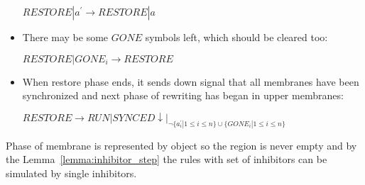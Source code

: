 \begin{dokaz}
\begin{itemize}
    $RESTORE|a^{\prime} \rightarrow RESTORE|a$

    \item There may be some $GONE$ symbols left, which should be cleared too:

    $RESTORE|GONE_i \rightarrow RESTORE$

    \item When restore phase ends, it sends down signal that all membranes have been synchronized and next phase of rewriting has began in upper membranes:

    $RESTORE \rightarrow RUN|SYNCED\downarrow|_{\neg \{a_i^{\prime}|1\leq i\leq n\}\cup\{GONE_i|1\leq i\leq n\}}$
  \end{itemize}


  Phase of membrane is represented by object so the region is never empty and by the Lemma~\ref{lemma:inhibitor_step} the rules with set of inhibitors can be simulated by single inhibitors.
\end{dokaz}

